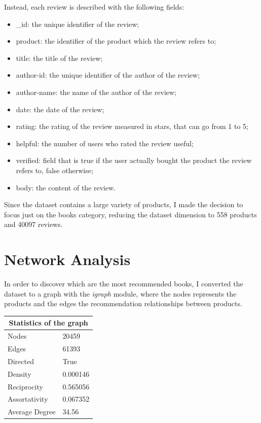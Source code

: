 \documentclass[a4paper,12pt]{article}
\begin{document}
\noindent Instead, each review is described with the following fields:
\begin{itemize}
	\item \_id: the unique identifier of the review;
	\item product: the identifier of the product which the review refers to;
	\item title: the title of the review;
	\item author-id: the unique identifier of the author of the review;
	\item author-name: the name of the author of the review;
	\item date: the date of the review;
	\item rating: the rating of the review measured in stars, that can go from 1 to 5;
	\item helpful: the number of users who rated the review useful;
	\item verified: field that is true if the user actually bought the product the review refers to, false
	otherwise;
	\item body: the content of the review.
\end{itemize}

\noindent Since the dataset contains a large variety of products, I made the decision to focus just on the books category, reducing the dataset dimension to 558 products and 40097 reviews. 

\newpage



\section{Network Analysis}
\noindent In order to discover which are the most recommended books, I converted the dataset to a graph with the \textit{igraph} module, where the nodes represents the products and the edges the recommendation relationships between products. 

\begin{table}[H]
	\centering
	\begin{tabular}{|l|l|}
		\hline
		\multicolumn{2}{|c|}{Statistics of the graph} \\ \hline
		Nodes                    & 20459              \\
		Edges                    & 61393              \\
		Directed                 & True               \\
		Density                  & 0.000146           \\
		Reciprocity              & 0.565056           \\
		Assortativity            & 0.067352           \\
		Average Degree           & 34.56             \\
		\hline
	\end{tabular}
\end{table}
\end{document}
